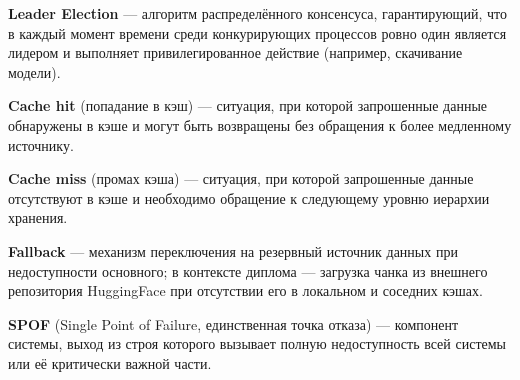 \textbf{Leader Election} --- алгоритм распределённого консенсуса, гарантирующий, что в каждый момент времени среди конкурирующих процессов ровно один является лидером и выполняет привилегированное действие (например, скачивание модели).

\textbf{Cache hit} (попадание в кэш) --- ситуация, при которой запрошенные данные обнаружены в кэше и могут быть возвращены без обращения к более медленному источнику.

\textbf{Cache miss} (промах кэша) --- ситуация, при которой запрошенные данные отсутствуют в кэше и необходимо обращение к следующему уровню иерархии хранения.

\textbf{Fallback} --- механизм переключения на резервный источник данных при недоступности основного; в контексте диплома --- загрузка чанка из внешнего репозитория HuggingFace при отсутствии его в локальном и соседних кэшах.

\textbf{SPOF} (Single Point of Failure, единственная точка отказа) --- компонент системы, выход из строя которого вызывает полную недоступность всей системы или её критически важной части.
